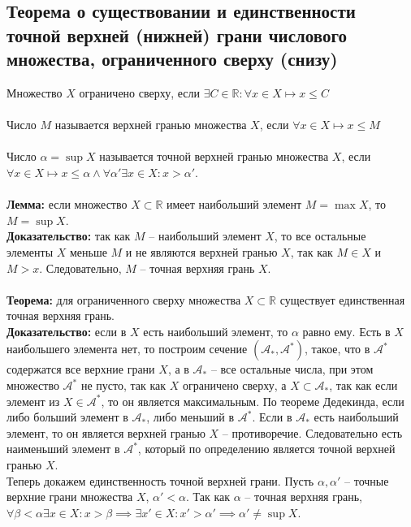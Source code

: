 \documentclass{article}
\begin{document}
        
    \subsection*{Теорема  о  существовании  и  единственности точной верхней (нижней) грани числового множества, ограниченного сверху (снизу)}
        Множество $X$ ограничено сверху, если $\exists C \in \mathbb{R}: \forall x \in X \longmapsto x \le C$
        \\
        \\
        Число $M$ называется верхней гранью множества $X$, если $\forall x \in X \longmapsto x \le M$
        \\
        \\
        Число $\alpha = \sup X$ называется точной верхней гранью множества $X$, если $\forall x \in X \longmapsto x \le \alpha \wedge \forall \alpha' \exists x \in X: x > \alpha'$.
        \\
        \\
        \textbf{Лемма:} если множество $X \subset \mathbb{R}$ имеет наибольший элемент $M = \max X$, то $M = \sup X$.
        \\
        \textbf{Доказательство:}
        так как $M$ -- наибольший элемент $X$, то все остальные элементы $X$ меньше $M$ и не являются верхней гранью $X$, так как
        $M \in X$ и $M > x$. Следовательно, $M$ -- точная верхняя грань $X$.
        \\
        \\
        \textbf{Теорема:} для ограниченного сверху множества $X \subset \mathbb{R}$ существует единственная точная верхняя грань.
        \\
        \textbf{Доказательство:}
        если в $X$ есть наибольший элемент, то $\alpha$ равно ему.
        Есть в $X$ наибольшего элемента нет, то построим сечение $(\mathcal{A_*}, \mathcal{A^*})$, такое, что в $\mathcal{A^*}$ содержатся все верхние грани $X$,
        а в $\mathcal{A_*}$ -- все остальные числа, при этом множество $\mathcal{A^*}$ не пусто, так как $X$ ограничено сверху,
        а $X \subset \mathcal{A_*}$, так как если элемент из $X \in \mathcal{A^*}$, то он является максимальным.
        По теореме Дедекинда, если либо больший элемент в $\mathcal{A_*}$, либо меньший в $\mathcal{A^*}$.
        Если в $\mathcal{A_*}$ есть наибольший элемент, то он является верхней гранью $X$ -- противоречие. Следовательно есть наименьший элемент в $\mathcal{A^*}$,
        который по определению является точной верхней гранью $X$.
        \\
        Теперь докажем единственность точной верхней грани.
        Пусть $\alpha, \alpha'$ -- точные верхние грани множества $X$, $\alpha' < \alpha$. Так как $\alpha$ -- точная верхняя грань,
        $\forall \beta < \alpha \exists x \in X: x > \beta \implies \exists x' \in X: x' > {\alpha'} \implies \alpha' \neq \sup X$.
        
\end{document}
